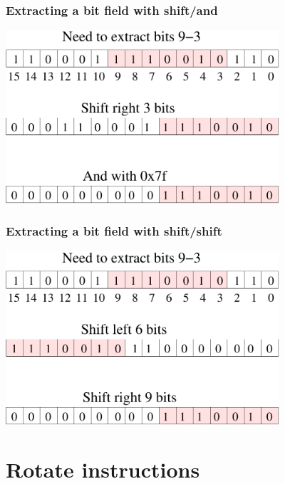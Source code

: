 \documentclass{beamer}
\begin{document}
\begin{frame}
    \frametitle{Extracting a bit field with shift/and}
    \begin{center}
        \includegraphics[width=4in]{extract_bits.pdf}
    \end{center}
\end{frame}

\begin{frame}
    \frametitle{Extracting a bit field with shift/shift}
    \begin{center}
        \includegraphics[width=4in]{extract_bits2.pdf}
    \end{center}
\end{frame}

\section{Rotate instructions}
\end{document}
